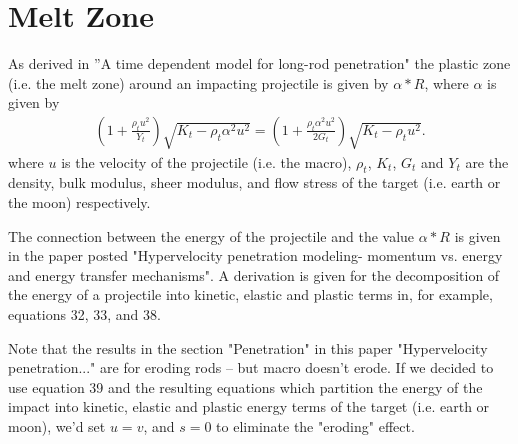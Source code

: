 \documentclass{article}
\begin{document}
\section{Melt Zone}
As derived in ''A time dependent model for long-rod penetration" the plastic zone (i.e. the melt zone) around an impacting projectile is given by $\alpha*R$, where $\alpha$ is given by 
\begin{align}
(1+\frac{\rho_t u^2}{Y_t})\sqrt{K_t - \rho_t \alpha^2 u^2} = (1+\frac{\rho_t \alpha^2 u^2}{2G_t})\sqrt{K_t - \rho_t u^2}.
\end{align}
where $u$ is the velocity of the projectile (i.e. the macro), $\rho_t$, $K_t$, $G_t$ and $Y_t$ are the density, bulk modulus, sheer modulus, and flow stress of the target (i.e. earth or the moon) respectively.

The connection between the energy of the projectile and the value $\alpha*R$ is given in the paper posted "Hypervelocity penetration modeling- momentum vs. energy and energy transfer mechanisms". A derivation is given for the decomposition of the energy of a projectile into kinetic, elastic and plastic terms in, for example, equations 32, 33, and 38.

Note that the results in the section "Penetration" in this paper "Hypervelocity penetration..." are for eroding rods -- but macro doesn't erode.  If we decided to use equation 39 and the resulting equations which partition the energy of the impact into kinetic, elastic and plastic energy terms of the target (i.e. earth or moon), we'd set $u = v$, and $s = 0$ to eliminate the "eroding" effect.
\end{document}
